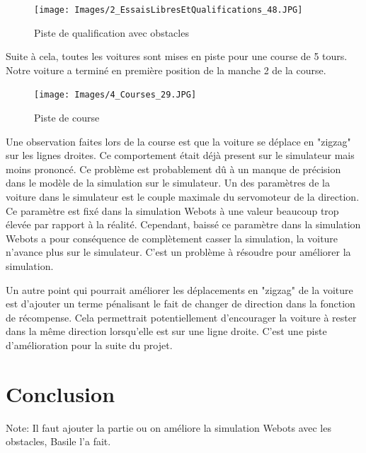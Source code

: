 \documentclass[french]{article}
\begin{document}
\begin{figure}[H]
    \centering
    \texttt{[image: Images/2\_EssaisLibresEtQualifications\_48.JPG]}
    \caption{Piste de qualification avec obstacles}
\end{figure}

Suite à cela, toutes les voitures sont mises en piste pour une course de 5 tours. Notre voiture a terminé en première 
position de la manche 2 de la course.

\begin{figure}[H]
    \centering
    \texttt{[image: Images/4\_Courses\_29.JPG]}
    \caption{Piste de course}
\end{figure}

Une observation faites lors de la course est que la voiture se déplace en "zigzag" sur les lignes droites. Ce 
comportement était déjà present sur le simulateur mais moins prononcé. Ce problème est probablement dû à un manque
de précision dans le modèle de la simulation sur le simulateur. Un des paramètres de la voiture dans le simulateur
est le couple maximale du servomoteur de la direction. Ce paramètre est fixé dans la simulation Webots à une valeur
beaucoup trop élevée par rapport à la réalité. Cependant, baissé ce paramètre dans la simulation Webots a pour
conséquence de complètement casser la simulation, la voiture n'avance plus sur le simulateur. C'est un problème 
à résoudre pour améliorer la simulation.

\vspace{0.5cm}
Un autre point qui pourrait améliorer les déplacements en "zigzag" de la voiture est d'ajouter un terme pénalisant 
le fait de changer de direction dans la fonction de récompense. Cela permettrait potentiellement d'encourager la 
voiture à rester dans la même direction lorsqu'elle est sur une ligne droite. C'est une piste d'amélioration pour 
la suite du projet.


    



\section{Conclusion}





Note:
Il faut ajouter la partie ou on améliore la simulation Webots avec les obstacles, Basile l'a fait.

\printbibliography
\end{document}
